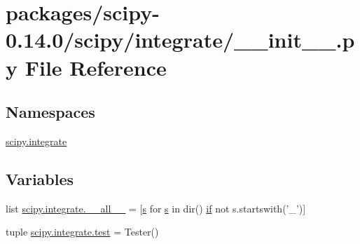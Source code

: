 \hypertarget{packages_2scipy-0_814_80_2scipy_2integrate_2____init_____8py}{}\section{packages/scipy-\/0.14.0/scipy/integrate/\+\_\+\+\_\+init\+\_\+\+\_\+.py File Reference}
\label{packages_2scipy-0_814_80_2scipy_2integrate_2____init_____8py}
\subsection*{Namespaces}
\begin{DoxyCompactItemize}
\item 
 \hyperlink{namespacescipy_1_1integrate}{scipy.\+integrate}
\end{DoxyCompactItemize}
\subsection*{Variables}
\begin{DoxyCompactItemize}
\item 
list \hyperlink{namespacescipy_1_1integrate_ad887b91b6b93340967dfe82daa61ca1b}{scipy.\+integrate.\+\_\+\+\_\+all\+\_\+\+\_\+} = \mbox{[}\hyperlink{indexexpr_8h_ae024b0db549122b44c349ae28ec990dc}{s} for \hyperlink{indexexpr_8h_ae024b0db549122b44c349ae28ec990dc}{s} in dir() \hyperlink{minmax_8h_a30a0ee9fee303f01d9c5e6f669e0dfe9}{if} not s.\+startswith('\+\_\+')\mbox{]}
\item 
tuple \hyperlink{namespacescipy_1_1integrate_a1bd54dfd45458d7b9cb45d78ee7e9739}{scipy.\+integrate.\+test} = Tester()
\end{DoxyCompactItemize}
